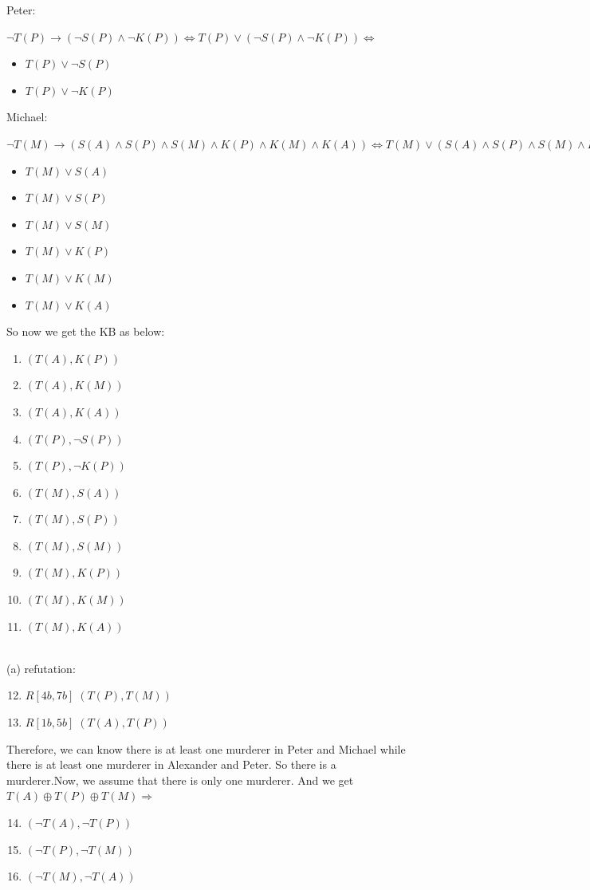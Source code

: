\documentclass[a4paper, 11pt]{article}
\begin{document}
Peter:

	$\lnot T(P) \to (\lnot S(P) \land \lnot K(P)) \iff T(P) \lor (\lnot S(P) \land \lnot K(P)) \iff $
	\begin{itemize}
		\item $T(P) \lor \lnot S(P)$
		\item $T(P) \lor \lnot K(P)$
	\end{itemize}

Michael:

	$\lnot T(M) \to (S(A) \land S(P) \land S(M) \land K(P) \land K(M) \land K(A)) \iff T(M) \lor (S(A) \land S(P) \land S(M) \land K(P) \land K(M) \land K(A)) \iff $
	\begin{itemize}
		\item $T(M) \lor S(A)$
		\item $T(M) \lor S(P)$
		\item $T(M) \lor S(M)$
		\item $T(M) \lor K(P)$
		\item $T(M) \lor K(M)$
		\item $T(M) \lor K(A)$
	\end{itemize}

So now we get the KB as below:
\begin{enumerate}
  \item $(T(A),K(P))$
  \item $(T(A),K(M))$
  \item $(T(A),K(A))$
  \item $(T(P),\lnot S(P))$
  \item $(T(P),\lnot K(P))$
  \item $(T(M),S(A))$
  \item $(T(M),S(P))$
	\item $(T(M),S(M))$
	\item $(T(M),K(P))$
	\item $(T(M),K(M))$
	\item $(T(M),K(A))$
\end{enumerate}

~\\
(a) refutation:
\begin{enumerate}
	\setcounter{enumi}{11}
	\item $ R[4b,7b] \;(T(P),T(M))$
	\item $ R[1b,5b] \;(T(A),T(P))$
\end{enumerate}

Therefore, we can know there is at least one murderer in Peter and Michael while there is at least one murderer in Alexander and Peter. So there is a murderer.Now, we assume that there is only one murderer. And we get $T(A) \oplus T(P) \oplus T(M) 	\Rightarrow $
\begin{enumerate}
	\setcounter{enumi}{13}
	\item $ (\lnot T(A), \lnot T(P)) $
	\item $ (\lnot T(P) , \lnot T(M)) $
	\item $ (\lnot T(M) , \lnot T(A)) $
\end{enumerate}
\end{document}
